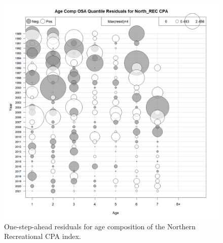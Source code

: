 \documentclass[
]{article}
\begin{document}
\begin{figure}

{\centering \includegraphics[width=1\linewidth]{../2023.RT.Runs/Run34/plots_png/diagnostics/Catch_age_comp_osa_resids_North_REC_CPA} 

}

\caption{One-step-ahead residuals for age composition of the Northern Recreational CPA index.}\label{fig:osa-North-reccpa-paa}
\end{figure}
\end{document}
